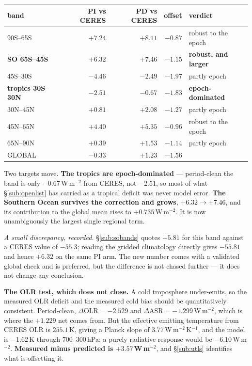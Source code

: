 \documentclass[10pt]{article}
\begin{document}
\begin{center}\footnotesize
\begin{tabular}{l r r r l}
\toprule
band & PI vs CERES & \textbf{PD vs CERES} & offset & verdict \\
\midrule
90S--65S & $+7.24$ & $+8.11$ & $-0.87$ & robust to the epoch \\
\textbf{SO 65S--45S} & $+6.32$ & $\mathbf{+7.46}$ & $-1.15$ & \textbf{robust, and larger} \\
45S--30S & $-4.46$ & $-2.49$ & $-1.97$ & partly epoch \\
\textbf{tropics 30S--30N} & $-2.51$ & $\mathbf{-0.67}$ & $-1.83$ & \textbf{epoch-dominated} \\
30N--45N & $+0.81$ & $+2.08$ & $-1.27$ & partly epoch \\
45N--65N & $+4.40$ & $+5.35$ & $-0.96$ & robust to the epoch \\
65N--90N & $+0.39$ & $+1.53$ & $-1.14$ & partly epoch \\
\midrule
GLOBAL & $-0.33$ & $\mathbf{+1.23}$ & $-1.56$ & \\
\bottomrule
\end{tabular}
\end{center}

\noindent Two targets move. \textbf{The tropics are epoch-dominated} --- period-clean the
band is only $-0.67$\,W\,m$^{-2}$ from CERES, not $-2.51$, so most of what
\S\ref{sub:openlist} has carried as a tropical deficit was never model error.
\textbf{The Southern Ocean survives the correction and grows}, $+6.32\to+7.46$, and its
contribution to the global mean rises to $+0.735$\,W\,m$^{-2}$. It is now unambiguously
the largest single regional term.

\emph{A small discrepancy, recorded.} \S\ref{sub:sobands} quotes $+5.81$ for this band
against a CERES value of $-55.3$; reading the gridded climatology directly gives $-55.81$
and hence $+6.32$ on the same PI arm. The new number comes with a validated global check
and is preferred, but the difference is not chased further --- it does not change any
conclusion.

\textbf{The OLR test, which does not close.} A cold troposphere under-emits, so the
measured OLR deficit and the measured cold bias should be quantitatively consistent.
Period-clean, $\Delta\mathrm{OLR}=-2.529$ and $\Delta\mathrm{ASR}=-1.299$\,W\,m$^{-2}$,
which is where the $+1.229$ net comes from. But the effective emitting temperature from
CERES OLR is $255.1$\,K, giving a Planck slope of $3.77$\,W\,m$^{-2}$\,K$^{-1}$, and the
model is $-1.62$\,K through 700--300\,hPa: a purely radiative response would be
$-6.10$\,W\,m$^{-2}$. \textbf{Measured minus predicted is $+3.57$\,W\,m$^{-2}$}, and
\S\ref{sub:utls} identifies what is offsetting it.
\end{document}
